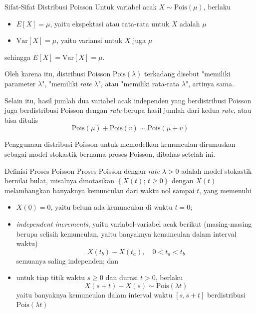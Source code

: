 \documentclass{beamer}
\newcommand{\brackets}[1]{\left[#1\right]}
\newcommand{\braces}[1]{\left\{#1\right\}}
\begin{document}
\begin{frame}{Sifat-Sifat Distribusi Poisson}
    Untuk variabel acak \(X \sim \text{Pois}(\mu)\), berlaku
    \begin{itemize}
        \item \(E\brackets{X} = \mu\), yaitu ekspektasi atau rata-rata untuk \(X\) adalah \(\mu\)
        \item \(\text{Var}\brackets{X} = \mu\), yaitu variansi untuk \(X\) juga \(\mu\)
    \end{itemize}
    sehingga \(E\brackets{X} = \text{Var}\brackets{X} = \mu\).

    Oleh karena itu, distribusi Poisson \(\text{Pois}(\lambda)\) terkadang disebut "memiliki parameter \(\lambda\)", "memiliki \textit{rate} \(\lambda\)", atau "memiliki rata-rata \(\lambda\)", artinya sama.

    Selain itu, hasil jumlah dua variabel acak independen yang berdistribusi Poisson juga berdistribusi Poisson dengan \textit{rate} berupa hasil jumlah dari kedua \textit{rate}, atau bisa ditulis
    \[\text{Pois}(\mu) + \text{Pois}(v) \sim \text{Pois}(\mu + v)\]

    Penggunaan distribusi Poisson untuk memodelkan kemunculan dirumuskan sebagai model stokastik bernama proses Poisson, dibahas setelah ini.
\end{frame}

\begin{frame}{Definisi Proses Poisson}
    Proses Poisson dengan \textit{rate} \(\lambda > 0\) adalah model stokastik bernilai bulat, misalnya dinotasikan \( \braces{X(t); \, t \ge 0} \) dengan \(X(t)\) melambangkan banyaknya kemunculan dari waktu nol sampai \(t\), yang memenuhi
    \begin{itemize}
        \item \(X(0) = 0\), yaitu belum ada kemunculan di waktu \(t=0\);
        \item \textit{independent increments}, yaitu variabel-variabel acak berikut (masing-masing berupa selisih kemunculan, yaitu banyaknya kemunculan dalam interval waktu)
        \[ X(t_b) - X(t_a), \quad 0 < t_a < t_b \]
        semuanya saling independen; dan
        \item untuk tiap titik waktu \(s \ge 0\) dan durasi \(t > 0\), berlaku
        \[X(s+t) - X(s) \sim \text{Pois}(\lambda t)\]
        yaitu banyaknya kemunculan dalam interval waktu \(\brackets{s,s+t}\) berdistribusi \(\text{Pois}(\lambda t)\)
    \end{itemize}
\end{frame}
\end{document}
